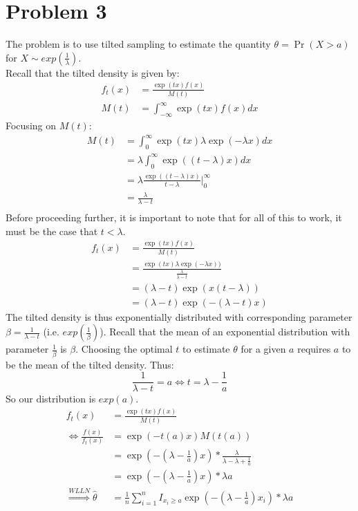 \documentclass[12pt]{article}
\newcommand{\LRA}{\Leftrightarrow}
\newcommand{\RA}{\Rightarrow}
\begin{document}
\section*{Problem 3}
	The problem is to use tilted sampling to estimate the quantity $ \theta = \Pr(X>a) $ for $ X\sim exp(\frac{1}{\lambda}) $. \\
	Recall that the tilted density is given by:
	\begin{align*}
	f_t(x) &= \frac{\exp(tx)f(x)}{M(t)} \\
	M(t) &= \int_{-\infty}^{\infty} \exp(tx)f(x) d x
	\end{align*}
	Focusing on $ M(t) $:
	\begin{align*}
		M(t) &= \int_{0}^{\infty} \exp(tx) \lambda \exp(-\lambda x) dx\\
		 &= \lambda \int_{0}^{\infty} \exp((t-\lambda)x) dx \\
		 &= \lambda \frac{\exp((t-\lambda)x)}{t-\lambda} \bigg\rvert_{0}^\infty \\ 
		 &= \frac{\lambda}{\lambda-t}\\
	\end{align*}
		Before proceeding further, it is important to note that for all of this to work, it must be the case that $ t < \lambda $.
	\begin{align*}
		 f_t(x) &= \frac{\exp(tx)f(x)}{M(t)} \\
		 &= \frac{\exp(tx)\lambda \exp(-\lambda x))}{\frac{\lambda}{\lambda-t}} \\
		 &= (\lambda-t)\exp(x(t-\lambda))\\
		 &= (\lambda-t)\exp(-(\lambda-t)x)
	\end{align*}
	The tilted density is thus exponentially distributed with corresponding parameter $ \beta = \frac{1}{\lambda - t} $ (i.e. $ exp(\frac{1}{\beta}) $). Recall that the mean of an exponential distribution with parameter $ \frac{1}{\beta} $ is $ \beta $. Choosing the optimal $ t $ to estimate $ \theta $ for a given $ a $ requires $ a $ to be the mean of the tilted density. Thus: \[ \frac{1}{\lambda - t} = a \LRA t = \lambda - \frac{1}{a} \]
	So our distribution is $ exp\left( a \right) $. 
	\begin{align*}
		f_t(x) &= \frac{\exp(tx)f(x)}{M(t)} \\
		\LRA \frac{f(x)}{f_t(x)} &= \exp(-t(a)x)M(t(a))\\
		&=\exp\left(-\left( \lambda - \frac{1}{a} \right)x\right)*\frac{\lambda}{\lambda-\lambda + \frac{1}{a}} \\
		& = \exp\left(-\left( \lambda - \frac{1}{a} \right)x\right)*\lambda a \\
		\overset{WLLN}{\RA} \hat{\theta} &= \frac{1}{n}\sum\limits_{i=1}^n I_{x_i\geq a} \exp\left(-\left( \lambda - \frac{1}{a} \right)x_i\right)*\lambda a
	\end{align*}
\end{document}
